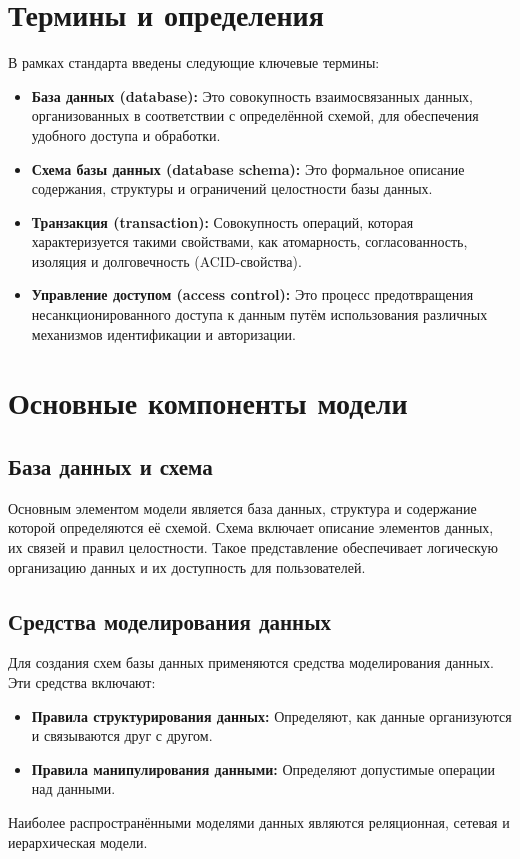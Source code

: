 \section*{Термины и определения}
В рамках стандарта введены следующие ключевые термины:
\begin{itemize}
    \item \textbf{База данных (database):} Это совокупность взаимосвязанных данных, организованных в соответствии с определённой схемой, для обеспечения удобного доступа и обработки.
    \item \textbf{Схема базы данных (database schema):} Это формальное описание содержания, структуры и ограничений целостности базы данных.
    \item \textbf{Транзакция (transaction):} Совокупность операций, которая характеризуется такими свойствами, как атомарность, согласованность, изоляция и долговечность (ACID-свойства).
    \item \textbf{Управление доступом (access control):} Это процесс предотвращения несанкционированного доступа к данным путём использования различных механизмов идентификации и авторизации.
\end{itemize}

\section*{Основные компоненты модели}

\subsection*{База данных и схема}
Основным элементом модели является база данных, структура и содержание которой определяются её схемой. Схема включает описание элементов данных, их связей и правил целостности. Такое представление обеспечивает логическую организацию данных и их доступность для пользователей.

\subsection*{Средства моделирования данных}
Для создания схем базы данных применяются средства моделирования данных. Эти средства включают:
\begin{itemize}
    \item \textbf{Правила структурирования данных:} Определяют, как данные организуются и связываются друг с другом.
    \item \textbf{Правила манипулирования данными:} Определяют допустимые операции над данными.
\end{itemize}
Наиболее распространёнными моделями данных являются реляционная, сетевая и иерархическая модели.


